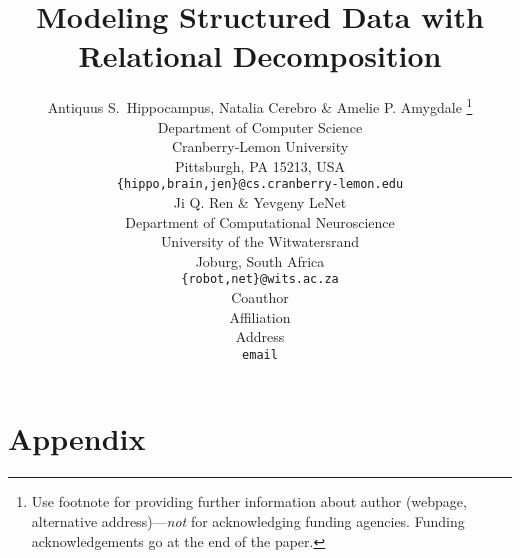 \documentclass{article} %
\title{Modeling Structured Data with Relational Decomposition}
\author{Antiquus S.~Hippocampus, Natalia Cerebro \& Amelie P. Amygdale \thanks{ Use footnote for providing further information
about author (webpage, alternative address)---\emph{not} for acknowledging
funding agencies.  Funding acknowledgements go at the end of the paper.} \\
Department of Computer Science\\
Cranberry-Lemon University\\
Pittsburgh, PA 15213, USA \\
\texttt{\{hippo,brain,jen\}@cs.cranberry-lemon.edu} \\
\And
Ji Q. Ren \& Yevgeny LeNet \\
Department of Computational Neuroscience \\
University of the Witwatersrand \\
Joburg, South Africa \\
\texttt{\{robot,net\}@wits.ac.za} \\
\AND
Coauthor \\
Affiliation \\
Address \\
\texttt{email}
}
\begin{document}
\maketitle











\appendix
\section{Appendix}
\end{document}
